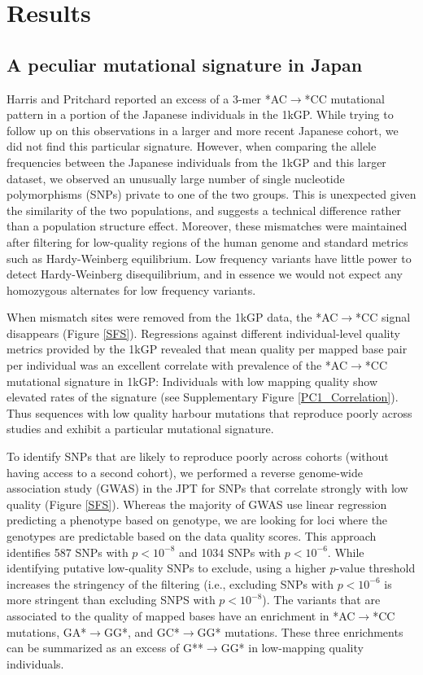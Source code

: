 \documentclass[9pt,lineno]{elife}
\begin{document}
			\section{Results}
	\subsection{A peculiar mutational signature in Japan}			
	
Harris and Pritchard reported an excess of a 3-mer *AC${\rightarrow}$*CC mutational pattern in a portion of the Japanese individuals in the 1kGP.\citep{Harris2015a}
While trying to follow up on this observations in a larger and more recent Japanese cohort, we did not find this particular signature.
However, when comparing the allele frequencies between the Japanese individuals from the 1kGP and this larger dataset, we observed an unusually large number of single nucleotide polymorphisms (SNPs) private to one of the two groups.
This is unexpected given the similarity of the two populations, and suggests a technical difference rather than a population structure effect. 
Moreover, these mismatches were maintained after filtering for low-quality regions of the human genome and standard metrics such as Hardy-Weinberg equilibrium.
Low frequency variants have little power to detect Hardy-Weinberg disequilibrium, and in essence we would not expect any homozygous alternates for low frequency variants. 

When mismatch sites were removed from the 1kGP data, the  *AC${\rightarrow}$*CC signal disappears (Figure \ref{SFS}).
Regressions against different individual-level quality metrics provided by the 1kGP revealed that mean quality per mapped base pair per individual was an excellent correlate with prevalence of the  *AC${\rightarrow}$*CC mutational signature in 1kGP:
Individuals with low mapping quality show elevated rates of the signature (see Supplementary Figure \ref{PC1_Correlation}).
Thus sequences with low quality harbour mutations that reproduce poorly across studies and exhibit a particular mutational signature. 

To identify SNPs that are likely to reproduce poorly across cohorts (without having access to a second cohort), we performed a reverse genome-wide association study (GWAS) in the JPT for SNPs that correlate strongly with low quality (Figure \ref{SFS}).
Whereas the majority of GWAS use linear regression predicting a phenotype based on genotype, we are looking for loci where the genotypes are predictable based on the data quality scores.
This approach identifies 587 SNPs with $p < 10^{-8}$ and 1034 SNPs with $ p < 10^{-6}$.
While identifying putative low-quality SNPs to exclude, using a higher $p$-value threshold increases the stringency of the filtering (i.e., excluding SNPs with $ p < 10^{-6}$ is more stringent than excluding SNPS with $p < 10^{-8}$). 
The variants that are associated to the quality of mapped bases have an enrichment in *AC${\rightarrow}$*CC mutations, GA*${\rightarrow}$GG*, and GC*${\rightarrow}$GG* mutations.
These three enrichments can be summarized as an excess of G**${\rightarrow}$GG* in low-mapping quality individuals.
\end{document}
